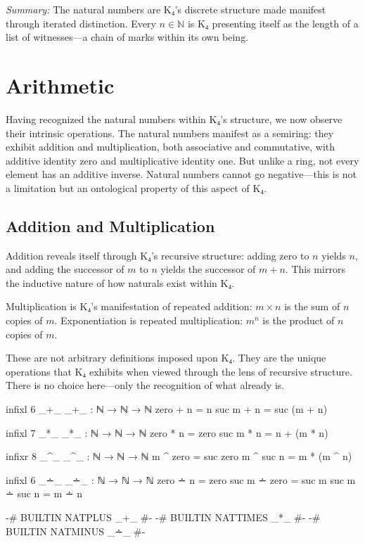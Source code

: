 \documentclass[11pt,a4paper]{book}
\begin{document}
\medskip
\noindent\textit{Summary:} The natural numbers are K₄'s discrete structure made manifest through iterated distinction.
Every $n \in \mathbb{N}$ is K₄ presenting itself as the length of a list of witnesses—a chain of marks within its own being.

\chapter{Arithmetic}

Having recognized the natural numbers within K₄'s structure, we now observe their intrinsic operations. The natural numbers manifest as a semiring: they exhibit addition and multiplication, both associative and commutative, with additive identity zero and multiplicative identity one. But unlike a ring, not every element has an additive inverse. Natural numbers cannot go negative—this is not a limitation but an ontological property of this aspect of K₄.

\section{Addition and Multiplication}

Addition reveals itself through K₄'s recursive structure: adding zero to $n$ yields $n$, and adding the successor of $m$ to $n$ yields the successor of $m + n$. This mirrors the inductive nature of how naturals exist within K₄.

Multiplication is K₄'s manifestation of repeated addition: $m \times n$ is the sum of $n$ copies of $m$. Exponentiation is repeated multiplication: $m^n$ is the product of $n$ copies of $m$.

These are not arbitrary definitions imposed upon K₄. They are the unique operations that K₄ exhibits when viewed through the lens of recursive structure. There is no choice here—only the recognition of what already is.

\begin{code}
infixl 6 _+_
_+_ : ℕ → ℕ → ℕ
zero  + n = n
suc m + n = suc (m + n)

infixl 7 _*_
_*_ : ℕ → ℕ → ℕ
zero  * n = zero
suc m * n = n + (m * n)

infixr 8 _^_
_^_ : ℕ → ℕ → ℕ
m ^ zero    = suc zero
m ^ suc n   = m * (m ^ n)

infixl 6 _∸_
_∸_ : ℕ → ℕ → ℕ
zero  ∸ n     = zero
suc m ∸ zero  = suc m
suc m ∸ suc n = m ∸ n

{-# BUILTIN NATPLUS  _+_ #-}
{-# BUILTIN NATTIMES _*_ #-}
{-# BUILTIN NATMINUS _∸_ #-}
\end{code}
\end{document}
